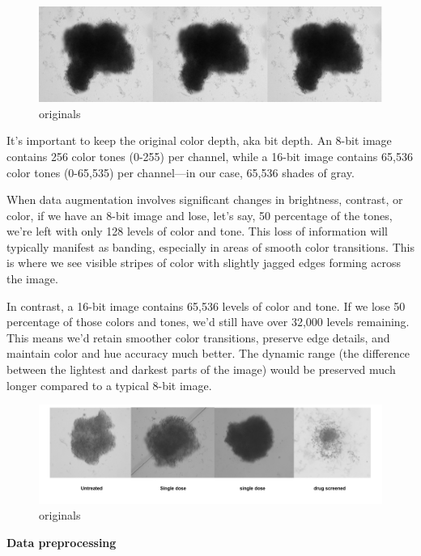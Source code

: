 \documentclass[12pt,twoside,a4paper,parskip]{scrbook} %
\begin{document}
\begin{figure}[H]
  \centering
  \includegraphics[scale=0.8]{figures/Three layers.png} 
  \caption{originals}
  \label{fig:Three l}
\end{figure}

It’s important to keep the original color depth, aka bit depth. An 8-bit image contains 256 color tones (0-255) per channel, while a 16-bit image contains 65,536 color tones (0-65,535) per channel—in our case, 65,536 shades of gray.

When data augmentation involves significant changes in brightness, contrast, or color, if we have an 8-bit image and lose, let’s say, 50 percentage of the tones, we’re left with only 128 levels of color and tone. This loss of information will typically manifest as banding, especially in areas of smooth color transitions. This is where we see visible stripes of color with slightly jagged edges forming across the image.

In contrast, a 16-bit image contains 65,536 levels of color and tone. If we lose 50 percentage of those colors and tones, we’d still have over 32,000 levels remaining. This means we’d retain smoother color transitions, preserve edge details, and maintain color and hue accuracy much better. The dynamic range (the difference between the lightest and darkest parts of the image) would be preserved much longer compared to a typical 8-bit image.

\begin{figure}[H]
  \centering
  \includegraphics[scale=0.8]{figures/originals.pdf} 
  \caption{originals}
  \label{fig:originals}
\end{figure}

\textbf{Data preprocessing}
\end{document}
